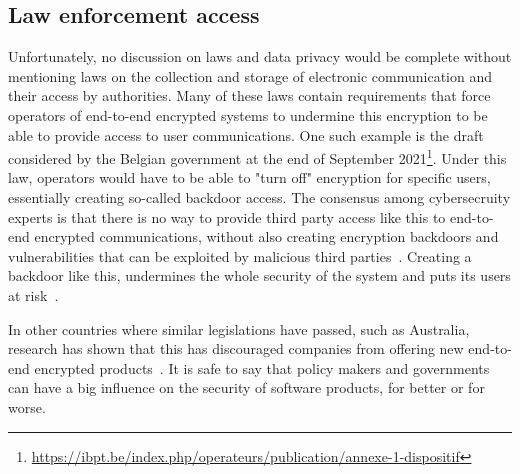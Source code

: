 \subsection{Law enforcement access}
Unfortunately, no discussion on laws and data privacy would be complete without mentioning laws on the collection and storage of electronic communication and their access by authorities.
Many of these laws contain requirements that force operators of end-to-end encrypted systems to undermine this encryption to be able to provide access to user communications.
One such example is the draft considered by the Belgian government at the end of September 2021\footnote{\url{https://ibpt.be/index.php/operateurs/publication/annexe-1-dispositif}}.
Under this law, operators would have to be able to "turn off" encryption for specific users, essentially creating so-called backdoor access.
The consensus among cybersecruity experts is that there is no way to provide third party access like this to end-to-end encrypted communications, without also creating encryption backdoors and vulnerabilities that can be exploited by malicious third parties~\cite{bliss1996effective}.
Creating a backdoor like this, undermines the whole security of the system and puts its users at risk~\cite{encryptionmyths}.

In other countries where similar legislations have passed, such as Australia, research has shown that this has discouraged companies from offering new end-to-end encrypted products~\cite{barker2021economic}.
It is safe to say that policy makers and governments can have a big influence on the security of software products, for better or for worse.